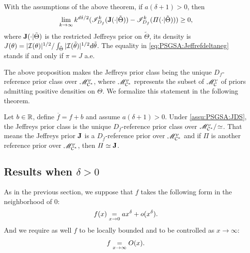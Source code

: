 \begin{prop}\label{prop:JlimIMdeltaneg}
    With the assumptions of the above theorem,  if $a(\delta+1)>0$, then
        \begin{equation}\label{eq:PSGSA:Jeffrefdeltaneg}
            \lim_{k\rightarrow\infty}k^{d\delta/2}(\mathscr{I}^k_{D_f}(\mathbf{J}(\cdot|\tilde\Theta))-\mathscr{I}_{D_f}^k(\varPi(\cdot|\tilde\Theta)))\geq 0 ,
        \end{equation}
    where $\mathbf{J}(\cdot|\tilde\Theta)$ is the restricted Jeffreys prior on $\tilde\Theta$, its density is $J(\theta)=|\mathcal{I}(\theta)|^{1/2}/\int_{\tilde\Theta}|\mathcal{I}(\tilde\theta)|^{1/2}d\tilde\theta$.
    The equality in \cref{eq:PSGSA:Jeffrefdeltaneg} stands if and only if 
    {$\pi=J$} a.e.
\end{prop}


The above proposition makes the Jeffreys prior class being the unique $D_f$-reference prior class over $\mathscr{M}^\nu_{\mathcal{C}^\ast}$, where $\mathscr{M}^\nu_{\mathcal{C}^\ast}$ represents the subset of $\mathscr{M}_{\mathcal{C}}^\nu$ of priors admitting positive densities on $\Theta$. We
 formalize this statement in the following theorem.



\begin{thm}\label{thm:PSGSA:Jrefdeltaneg}
    Let $b\in\mathbb{R}$, define $\overline{f}=f+b$ and assume $a(\delta+1)>0$.
    Under \cref{assu:PSGSA:JDS}, the Jeffreys prior class is the unique $D_{\overline f}$-reference prior class over $\mathscr{M}^\nu_{\mathcal{C}^\ast}/\!\simeq$.
    That means the Jeffreys prior $\mathbf{J}$ is a $D_{\overline f}$-reference prior over $\mathscr{M}^\nu_{\mathcal{C}^\ast}$ and if $\varPi$ is another reference prior over $\mathscr{M}^\nu_{\mathcal{C}^\ast}$, then $\varPi\simeq\mathbf{J}$.
\end{thm}



\subsection{Results when $\delta>0$}


As in the previous section, we suppose that $f$ takes the following form in the neighborhood of $0$:
\begin{equation}
    f(x) \overset{}{\underset{x\rightarrow0}{=}} a x^\delta + o(x^\delta).
\end{equation}
And we require as well $f$ to be locally bounded and to be controlled as $x\to\infty$: 
\begin{equation}
f\overset{}{\underset{x\rightarrow\infty}{=}}O(x).
\end{equation}

